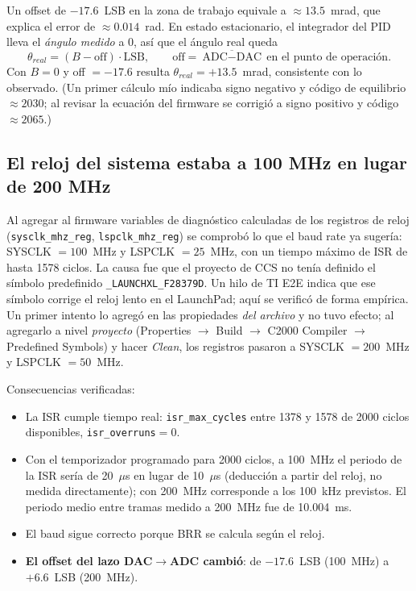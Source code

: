 \documentclass[11pt,a4paper]{article}
\begin{document}
Un offset de $-17.6$~LSB en la zona de trabajo equivale a $\approx 13.5$~mrad, que explica el error de $\approx 0.014$~rad. En estado estacionario, el integrador del PID lleva el \emph{ángulo medido} a 0, así que el ángulo real queda
\begin{equation}
\theta_{real}=(B-\text{off})\cdot\text{LSB},\qquad \text{off}=\overline{\text{ADC}-\text{DAC}}\ \text{en el punto de operación}.
\end{equation}
Con $B=0$ y off $=-17.6$ resulta $\theta_{real}=+13.5$~mrad, consistente con lo observado. (Un primer cálculo mío indicaba signo negativo y código de equilibrio $\approx 2030$; al revisar la ecuación del firmware se corrigió a signo positivo y código $\approx 2065$.)

\subsection{El reloj del sistema estaba a 100 MHz en lugar de 200 MHz}
\label{sec:reloj}

Al agregar al firmware variables de diagnóstico calculadas de los registros de reloj (\texttt{sysclk\_mhz\_reg}, \texttt{lspclk\_mhz\_reg}) se comprobó lo que el baud rate ya sugería: SYSCLK $=100$~MHz y LSPCLK $=25$~MHz, con un tiempo máximo de ISR de hasta 1578 ciclos. La causa fue que el proyecto de CCS no tenía definido el símbolo predefinido \texttt{\_LAUNCHXL\_F28379D}. Un hilo de TI E2E indica que ese símbolo corrige el reloj lento en el LaunchPad; aquí se verificó de forma empírica. Un primer intento lo agregó en las propiedades \emph{del archivo} y no tuvo efecto; al agregarlo a nivel \emph{proyecto} (Properties $\rightarrow$ Build $\rightarrow$ C2000 Compiler $\rightarrow$ Predefined Symbols) y hacer \emph{Clean}, los registros pasaron a SYSCLK $=200$~MHz y LSPCLK $=50$~MHz.

Consecuencias verificadas:
\begin{itemize}
    \item La ISR cumple tiempo real: \texttt{isr\_max\_cycles} entre 1378 y 1578 de 2000 ciclos disponibles, \texttt{isr\_overruns}$=0$.
    \item Con el temporizador programado para 2000 ciclos, a 100~MHz el periodo de la ISR sería de 20~$\mu$s en lugar de 10~$\mu$s (deducción a partir del reloj, no medida directamente); con 200~MHz corresponde a los 100~kHz previstos. El periodo medio entre tramas medido a 200~MHz fue de 10.004~ms.
    \item El baud sigue correcto porque BRR se calcula según el reloj.
    \item \textbf{El offset del lazo DAC$\rightarrow$ADC cambió}: de $-17.6$~LSB (100~MHz) a $+6.6$~LSB (200~MHz).
\end{itemize}
\end{document}
